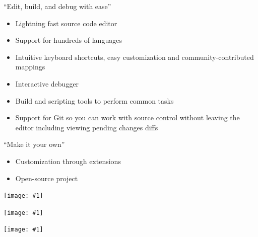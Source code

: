 \documentclass[
  11pt,
  ignorenonframetext,
  aspectratio=169]{beamer}
\providecommand{\tightlist}{%
  \setlength{\itemsep}{0pt}\setlength{\parskip}{0pt}}
\newcommand{\fullframegraphic}[1]{
  \texttt{[image: \#1]}
}
\newlength\beamerleftmargin
\begin{document}
\begin{frame}{``Edit, build, and debug with ease''}
\protect\hypertarget{edit-build-and-debug-with-ease}{}
\begin{itemize}
\tightlist
\item
  Lightning fast source code editor
\item
  Support for hundreds of languages
\item
  Intuitive keyboard shortcuts, easy customization and
  community-contributed mappings
\item
  Interactive debugger
\item
  Build and scripting tools to perform common tasks
\item
  Support for Git so you can work with source control without leaving
  the editor including viewing pending changes diffs
\end{itemize}
\end{frame}

\begin{frame}{``Make it your own''}
\protect\hypertarget{make-it-your-own}{}
\begin{itemize}
\tightlist
\item
  Customization through extensions
\item
  Open-source project
\end{itemize}
\end{frame}

\begin{frame}{}
\protect\hypertarget{section-9}{}
\vspace*{-10.6mm}\hspace*{-\beamerleftmargin}\hspace*{-1.5mm}
\fullframegraphic{"../captures/Capture d’écran (5)"}
\end{frame}

\begin{frame}{}
\protect\hypertarget{section-10}{}
\vspace*{-10.6mm}\hspace*{-\beamerleftmargin}\hspace*{-1.5mm}
\fullframegraphic{"../captures/Capture d’écran (6)"}
\end{frame}

\begin{frame}{}
\protect\hypertarget{section-11}{}
\vspace*{-10.6mm}\hspace*{-\beamerleftmargin}\hspace*{-1.5mm}
\fullframegraphic{"../captures/Capture d’écran (8)"}
\end{frame}
\end{document}
